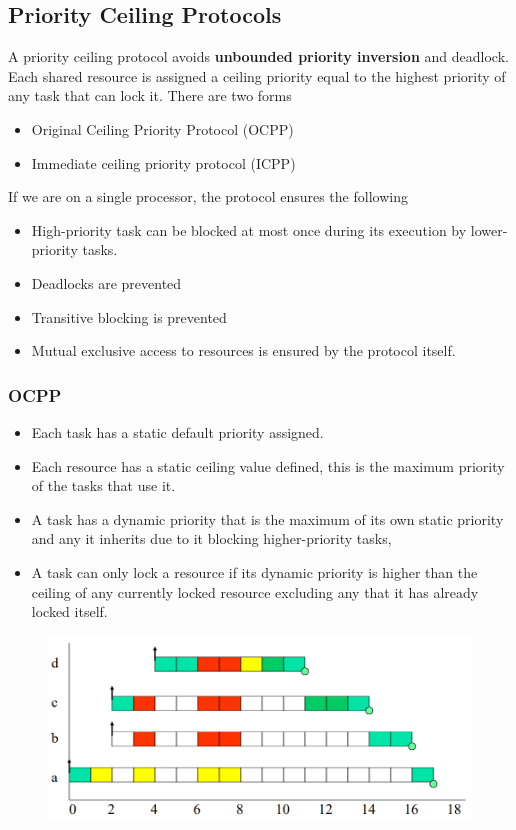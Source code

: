 \subsection{Priority Ceiling Protocols}
A priority ceiling protocol avoids \textbf{unbounded priority inversion} and deadlock. Each shared resource is assigned a ceiling priority equal to the highest priority of any task that can lock it. There are two forms
\begin{itemize}
\item Original Ceiling Priority Protocol (OCPP)
\item Immediate ceiling priority protocol (ICPP)
\end{itemize}
If we are on a single processor, the protocol ensures the following
\begin{itemize}
\item High-priority task can be blocked at most once during its execution by lower-priority tasks.
\item Deadlocks are prevented
\item Transitive blocking is prevented
\item Mutual exclusive access to resources is ensured by the protocol itself.
\end{itemize}

\subsubsection{OCPP}
\begin{itemize}
\item Each task has a static default priority assigned.
\item  Each resource has a static ceiling value defined, this is the maximum priority of the tasks that use it.
\item A task has a dynamic priority that is the maximum of its own static priority and any it inherits due to it blocking higher-priority tasks,
\item A task can only lock a resource if its dynamic priority is higher than the ceiling of any currently locked resource excluding any that it has already locked itself.
\end{itemize}
\begin{figure}[H]
\centering
\includegraphics[width=0.9\linewidth]{figures/Scheduling/Priority Inversion/OCPP.PNG}
\end{figure}

